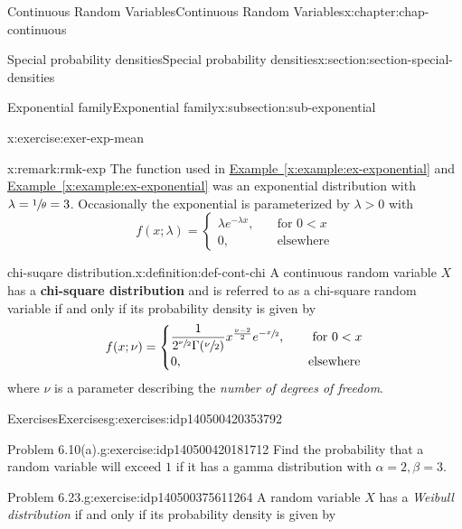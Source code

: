 \documentclass[oneside,10pt,]{book}
\newcommand{\xreffont}{\relax}
\newcommand{\terminology}[1]{\textbf{#1}}
\newcommand{\lt}{<}
\newcommand{\gt}{>}
\newcommand{\amp}{&}
\begin{document}
\begin{chapterptx}{Continuous Random Variables}{}{Continuous Random Variables}{}{}{x:chapter:chap-continuous}
\begin{sectionptx}{Special probability densities}{}{Special probability densities}{}{}{x:section:section-special-densities}
\begin{subsectionptx}{Exponential family}{}{Exponential family}{}{}{x:subsection:sub-exponential}
\begin{inlineexercise}{}{x:exercise:exer-exp-mean}
\end{inlineexercise}
\begin{remark}{}{x:remark:rmk-exp}%
The function used in \hyperref[x:example:ex-exponential]{Example~{\xreffont\ref{x:example:ex-exponential}}} and \hyperref[x:example:ex-exponential]{Example~{\xreffont\ref{x:example:ex-exponential}}} was an exponential distribution with \(\lambda = \sfrac{1}{\theta} = 3\).  Occasionally the exponential is parameterized by \(\lambda \gt 0\) with%
\begin{equation*}
f(x; \lambda) =
\begin{cases}\lambda e^{-\lambda x}, \amp \quad \text{
for } 0 \lt x\\0, \amp \quad \text{elsewhere}\end{cases}
\end{equation*}
%
\end{remark}
\begin{definition}{chi-suqare distribution.}{x:definition:def-cont-chi}%
A continuous random variable \(\displaystyle X\) has a \terminology{chi-square distribution} and is referred to as a chi-square random variable if and only if its probability density is given by%
\begin{equation*}
f(x; \nu) =
\begin{cases}\dfrac{1}{2^{\sfrac{\nu}{2}}
\Gamma(\sfrac{\nu}{2})}x^{\frac{\nu-2}{2}}e^{-\sfrac{x}{2}}, \amp \quad
\text{
for }0 \lt x\\0, \amp \quad \text{elsewhere}\end{cases}
\end{equation*}
where \(\nu\) is a parameter describing the \emph{number of degrees of freedom}.%
\end{definition}
%
%
\typeout{************************************************}
\typeout{************************************************}
%
\begin{exercises-subsubsection}{Exercises}{}{Exercises}{}{}{g:exercises:idp140500420353792}
\begin{divisionexercise}{1}{Problem 6.10(a).}{}{g:exercise:idp140500420181712}%
Find the probability that a random variable will exceed \(1\) if it has a gamma distribution with \(\alpha=2, \beta=3\).%
\end{divisionexercise}%
\begin{divisionexercise}{2}{Problem 6.23.}{}{g:exercise:idp140500375611264}%
A random variable \(X\) has a \emph{Weibull distribution} if and only if its probability density is given by%
\begin{equation*}

\end{equation*}
\end{divisionexercise}
\end{exercises-subsubsection}
\end{subsectionptx}
\end{sectionptx}
\end{chapterptx}
\end{document}
